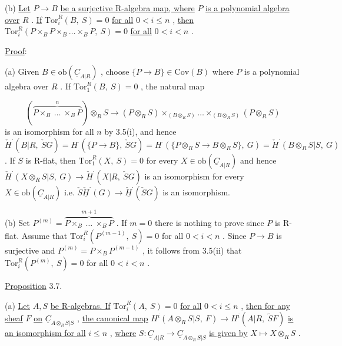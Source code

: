 (b)  \underline{Let}  $P \to B$  \underline{be a surjective R-algebra map, where}  $P$  \underline{is a polynomial algebra over}  $R$  . \underline{If}  $\mathrm{Tor}^R_i(B,\ S) = 0$  \underline{for all}  $0 < i \leq n$  , \underline{then} $\mathrm{Tor}^R_i(P\times_B P\times_B \ldots \times_B P,\ S) = 0$  \underline{for all}  $0 < i < n$  .


\underline{Proof}:

(a)  Given  $B \in \mathrm{ob}(\underline{C}_{A|R})$  , choose  $\{P \to B\} \in \mathrm{Cov}(B)$  where  $P$  is a polynomial algebra over  $R$  . If  $\mathrm{Tor}^R_1(B,\ S) = 0$  , the natural map

\begin{equation*}
(\overbrace{P\times_B \ \ldots\ \times_B P}^{\,n\,})\otimes_R S \to (P\otimes_R S)\times_{(B\otimes_R S)} \ldots \times_{(B\otimes_R S)} (P\otimes_R S)
\end{equation*}
is an isomorphism for all  $n$  by 3.5(i), and hence  $\check{H}^{\cdot}(B|R,\ \check{S}G) = H^{\cdot}(\{P \to B\},\ \check{S}G) = H^{\cdot}(\{P\otimes_R S \to B\otimes_R S\},\ G) = \check{H}^{\cdot}(B\otimes_R S|S,\ G)$  . If  $S$  is R-flat, then  $\mathrm{Tor}^R_1(X,\ S) = 0$  for every  $X \in \mathrm{ob}(\underline{C}_{A|R})$  and hence $\check{H}^{\cdot}(X\otimes_R S|S,\ G) \to \check{H}^{\cdot}(X|R,\ \check{S}G)$  is an isomorphism for every  $X \in \mathrm{ob}(\underline{C}_{A|R})$  i.e. $\check{S}\underline{\check{H}}^{\cdot}(G) \to \underline{\check{H}}^{\cdot}(\check{S}G)$  is an isomorphism.

(b)  Set  $P^{(m)} = \overbrace{P\times_B \ \ldots\ \times_B P}^{\,m+1\,}$  . If  $m = 0$  there is nothing to prove since  $P$  is R-flat. Assume that  $\mathrm{Tor}^R_i(P^{(m-1)},\ S) = 0$  for all  $0 < i < n$  . Since  $P \to B$  is surjective and  $P^{(m)} = P\times_B P^{(m-1)}$  , it follows from 3.5(ii) that $\mathrm{Tor}^R_i(P^{(m)},\ S) = 0$  for all  $0 < i < n$  .




\underline{Proposition} 3.7.

(a)  \underline{Let}  $A, S$  \underline{be R-algebras. If}  $\mathrm{Tor}^R_i(A,\ S) = 0$  \underline{for all}  $0 < i \leq n$  , \underline{then for any sheaf}  $F$  \underline{on}  $\underline{C}_{A\otimes_R S|S}$  , \underline{the canonical map}  $H^i(A\otimes_R S|S,\ F) \to H^i(A|R,\ \widetilde{S}F)$ \underline{is an isomorphism for all}  $i \leq n$  , \underline{where}  $S : \underline{C}_{A|R} \to \underline{C}_{A\otimes_R S|S}$  \underline{is given by} $X \longmapsto X\otimes_R S$  .

